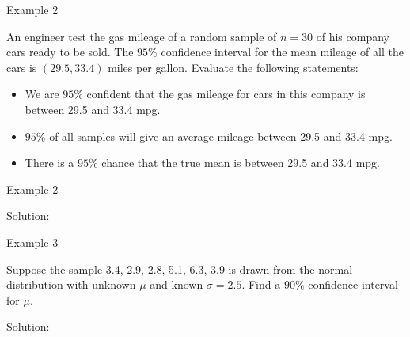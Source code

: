 \documentclass[
  ignorenonframetext,
]{beamer}
\begin{document}
\begin{frame}{Example 2}
\label{example-2}
\begin{tcolorbox}
An engineer test the gas mileage of a random sample of $n=30$ of his company cars ready to be sold. The $95\%$ confidence interval for the mean mileage of all the cars is $(29.5, 33.4)$ miles per gallon. Evaluate the following statements:
\begin{itemize}
\item We are $95\%$ confident that the gas mileage for cars in this company is between 29.5 and 33.4 mpg.

\item $95\%$ of all samples will give an average mileage between 29.5 and 33.4 mpg.

\item There is a $95\%$ chance that the true mean is between 29.5 and 33.4 mpg.
\end{itemize}
\end{tcolorbox}
\end{frame}

\begin{frame}{Example 2}
\label{example-2-1}
\begin{tcolorbox}
Solution: 

\vspace{30mm}

\end{tcolorbox}
\end{frame}

\begin{frame}{Example 3}
\label{example-3}
\begin{tcolorbox}
 Suppose the sample 3.4, 2.9, 2.8, 5.1, 6.3, 3.9 is drawn from the normal distribution with unknown $\mu$ and known $\sigma=2.5$. Find a $90\%$ confidence interval for $\mu$.
\end{tcolorbox}

\begin{tcolorbox}
Solution: 

\vspace{30mm}


\end{tcolorbox}
\end{frame}
\end{document}
